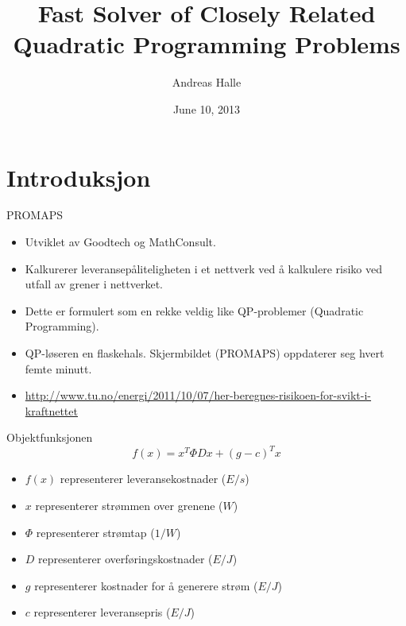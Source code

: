\documentclass{beamer}
\title[Fast Solver of Closely Related Quadratic Programming Problems]
      {Fast Solver of Closely Related Quadratic Programming Problems}
\author{Andreas Halle}
\institute{Department of Informatics}
\date{June 10, 2013}
\begin{document}
\begin{frame}
\titlepage
\end{frame}



\section{Introduksjon}



\begin{frame}{PROMAPS}
\begin{itemize}
\item Utviklet av Goodtech og MathConsult.
\item Kalkurerer leveransepåliteligheten i et nettverk ved å kalkulere risiko
      ved utfall av grener i nettverket.
\item Dette er formulert som en rekke veldig like QP-problemer
      (Quadratic Programming).
\item QP-løseren en flaskehals. Skjermbildet (PROMAPS) oppdaterer seg hvert
      femte minutt.
\item \url{http://www.tu.no/energi/2011/10/07/her-beregnes-risikoen-for-svikt-i-kraftnettet}
\end{itemize}
\end{frame}






\begin{frame}{Objektfunksjonen}
\[
f(x) = x^T \Phi D x + (g - c)^T x
\]
\begin{itemize}
\item $f(x)$ representerer leveransekostnader ($E/s$)
\item $x$ representerer strømmen over grenene ($W$)
\item $\Phi$ representerer strømtap ($1/W$)
\item $D$ representerer overføringskostnader ($E/J$)
\item $g$ representerer kostnader for å generere strøm ($E/J$)
\item $c$ representerer leveransepris ($E/J$)
\end{itemize}
\end{frame}
\end{document}
